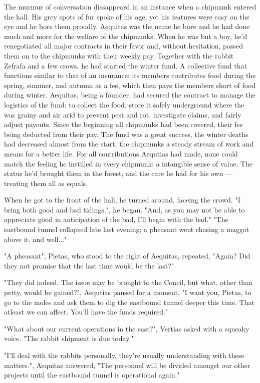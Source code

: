\documentclass[smalldemyvopaper,11pt,twoside,onecolumn,openright,extrafontsizes]{memoir}
\begin{document}
The murmur of conversation dissappeard in an instance when a chipmunk entered the hall. His grey spots of fur spoke of his age, yet his features were easy on the eye and he bore them proudly.
 Aequitas was the name he bore and he had done much and more for the welfare of the chipmunks. When he was but a boy, he'd renegotiated all major contracts in their favor and, without hesitation, passed them on to the chipmunks with their weekly pay. Together with the rabbit Zefrafa and a few crows, he had started the winter fund. A collective fund that functions similar to that of an insurance: its members contributes food during the spring, summer, and autumn as a fee, which then pays the members short of food during winter. Aequitas, being a founder, had secured the contract to manage the logistics of the fund: to collect the food, store it safely underground where the was grainy and air arid to prevent pest and rot, investigate claims, and fairly adjust payouts. Since the beginning all chipmunks had been covered, their fee being deducted from their pay. The fund was a great success, the winter deaths had decreased almost from the start; the chipmunks a steady stream of work and means for a better life.
For all contributions Aequtias had made, none could match the feeling he instilled in every chipmunk: a intangible sense of value. The status he'd brought them in the forest, and the care he had for his own — treating them all as equals.

When he got to the front of the hall, he turned around, faceing the crowd.
"I bring both good and bad tidings.", he began. "And, as you may not be able to appreciate good in anticipation of the bad, I'll begin with the bad."
  "The eastbound tunnel collapsed late last evening; a pheasant went chasing a maggot above it, and well..."

"A pheasant", Pietas, who stood to the right of Aequitas, repeated, "Again? Did they not promise that the last time would be the last?"  

"They did indeed. The issue may be brought to the Concil, but what, other than petty, would be gained?", Aequtias paused for a moment, "I want you, Pietas, to go to the moles and ask them to dig the eastbound tunnel deeper this time. That atleast we can affect. You'll have the funds required."

"What about our current operations in the east?", Vertias asked with a squeaky voice. "The rabbit shipment is due today." 

"I'll deal with the rabbits personally, they're usually understanding with these matters.", Aequitas answered, "The personnel will be divided amongst our other projects until the eastbound tunnel is operational again."
\end{document}
